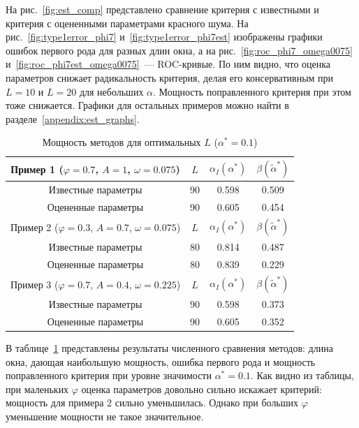 \documentclass[specialist,
substylefile = spbu.rtx,
               subf,href,colorlinks=true,12pt]{disser}
\theoremstyle{definition}
\begin{document}
На рис.~\ref{fig:est_comp} представлено сравнение критерия с известными и критерия с оцененными параметрами красного шума. На рис.~\ref{fig:type1error_phi7} и~\ref{fig:type1error_phi7est} изображены графики ошибок первого рода для разных длин окна, а на рис.~\ref{fig:roc_phi7_omega0075} и~\ref{fig:roc_phi7est_omega0075}~--- ROC-кривые. По ним видно, что оценка параметров снижает радикальность критерия, делая его консервативным при $L=10$ и $L=20$ для небольших $\alpha$. Мощность поправленного критерия при этом тоже снижается. Графики для остальных примеров можно найти в разделе~\ref{appendix:est_graphs}.
\begin{table}[h]
	\caption{Мощность методов для оптимальных $L$ ($\alpha^*=0.1$)}
	\label{tab:res_mc-ssa_est}
	\centering
	\begin{tabular}{|cccc|}\hline
		Пример 1 ($\varphi=0.7$, $A=1$, $\omega=0.075$) & $L$ & $\alpha_I(\alpha^*)$ & $\beta(\widetilde\alpha^*)$ \\
		\hline
		Известные параметры & 90 & 0.598 & 0.509 \\
		\hline
		Оцененные параметры & 90 & 0.605 & 0.454 \\
		\hhline{====}
		Пример 2 ($\varphi=0.3$, $A=0.7$, $\omega=0.075$) & $L$ & $\alpha_I(\alpha^*)$ & $\beta(\widetilde\alpha^*)$ \\
		\hline
		Известные параметры & 80 & 0.814 & 0.487 \\
		\hline
		Оцененные параметры & 80 & 0.839 & 0.229 \\
		\hhline{====}
		Пример 3 ($\varphi=0.7$, $A=0.4$, $\omega=0.225$) & $L$ & $\alpha_I(\alpha^*)$ & $\beta(\widetilde\alpha^*)$ \\
		\hline
		Известные параметры & 90 & 0.598 & 0.373 \\
		\hline
		Оцененные параметры & 90 & 0.605 & 0.352\\
		\hline
	\end{tabular}
\end{table}

В таблице~\ref{tab:res_mc-ssa_est} представлены результаты численного сравнения методов: длина окна, дающая наибольшую мощность, ошибка первого рода и мощность поправленного критерия при уровне значимости $\alpha^*=0.1$. Как видно из таблицы, при маленьких $\varphi$ оценка параметров довольно сильно искажает критерий: мощность для примера 2 сильно уменьшилась. Однако при больших $\varphi$ уменьшение мощности не такое значительное.
\end{document}

